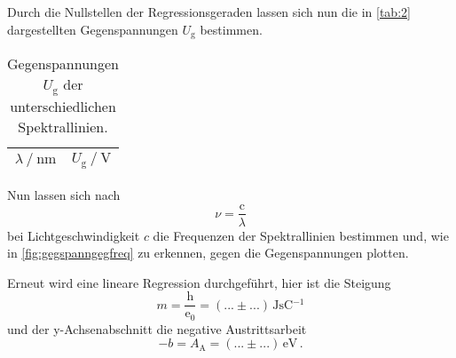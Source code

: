 
Durch die Nullstellen der Regressionsgeraden lassen sich nun die in \autoref{tab:2} dargestellten Gegenspannungen $U_\text{g}$ bestimmen.

\begin{table}[H]
    \centering
    \caption{Gegenspannungen $U_\text{g}$ der unterschiedlichen Spektrallinien.}
    \label{tab:2}
    \begin{tabular}{S S}
      \toprule
        $\lambda \mathbin{/} \si{\nano\meter}$ & $U_\text{g} \mathbin{/} \si{\volt}$ \\
      \midrule


      \bottomrule
    \end{tabular}
\end{table}

Nun lassen sich nach
\begin{equation*}
    \nu = \dfrac{\text{c}}{\lambda}
\end{equation*}
bei Lichtgeschwindigkeit $c$ die Frequenzen der Spektrallinien bestimmen und, wie in \autoref{fig:gegspanngegfreq} zu erkennen, gegen die Gegenspannungen plotten.


Erneut wird eine lineare Regression durchgeführt, hier ist die Steigung
\begin{equation*}
    m = \dfrac{\text{h}}{\text{e}_0} = (... \pm ...) \,\si{\joule\second\coulomb^{-1}}
\end{equation*}
und der y-Achsenabschnitt die negative Austrittsarbeit 
\begin{equation*}
    -b = A_\text{A} = (... \pm ...) \,\si{\eV} \,.
\end{equation*}


